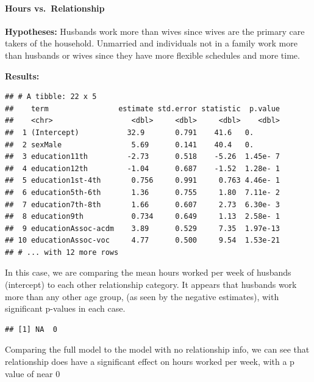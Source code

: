 \documentclass[]{article}
\newenvironment{Shaded}{\begin{snugshade}}{\end{snugshade}}
\newcommand{\KeywordTok}[1]{\textcolor[rgb]{0.13,0.29,0.53}{\textbf{#1}}}
\newcommand{\NormalTok}[1]{#1}
\newcommand{\OperatorTok}[1]{\textcolor[rgb]{0.81,0.36,0.00}{\textbf{#1}}}
\let\oldparagraph\paragraph
\renewcommand{\paragraph}[1]{\oldparagraph{#1}\mbox{}}
\begin{document}
\hypertarget{hours-vs.-relationship}{%
\paragraph{Hours vs.~Relationship}\label{hours-vs.-relationship}}

\textbf{Hypotheses:} Husbands work more than wives since wives are the
primary care takers of the household. Unmarried and individuals not in a
family work more than husbands or wives since they have more flexible
schedules and more time.

\textbf{Results:}

\begin{verbatim}
## # A tibble: 22 x 5
##    term                estimate std.error statistic  p.value
##    <chr>                  <dbl>     <dbl>     <dbl>    <dbl>
##  1 (Intercept)           32.9       0.791    41.6   0.      
##  2 sexMale                5.69      0.141    40.4   0.      
##  3 education11th         -2.73      0.518    -5.26  1.45e- 7
##  4 education12th         -1.04      0.687    -1.52  1.28e- 1
##  5 education1st-4th       0.756     0.991     0.763 4.46e- 1
##  6 education5th-6th       1.36      0.755     1.80  7.11e- 2
##  7 education7th-8th       1.66      0.607     2.73  6.30e- 3
##  8 education9th           0.734     0.649     1.13  2.58e- 1
##  9 educationAssoc-acdm    3.89      0.529     7.35  1.97e-13
## 10 educationAssoc-voc     4.77      0.500     9.54  1.53e-21
## # ... with 12 more rows
\end{verbatim}

In this case, we are comparing the mean hours worked per week of
husbands (intercept) to each other relationship category. It appears
that husbands work more than any other age group, (as seen by the
negative estimates), with significant p-values in each case.

\begin{Shaded}
\end{Shaded}

\begin{verbatim}
## [1] NA  0
\end{verbatim}

Comparing the full model to the model with no relationship info, we can
see that relationship does have a significant effect on hours worked per
week, with a p value of near 0
\end{document}
